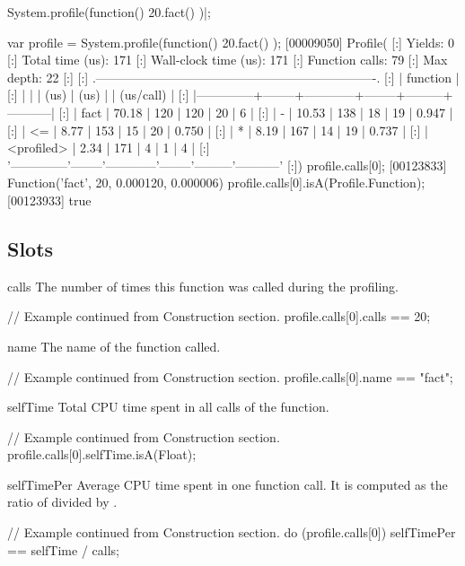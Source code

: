 \begin{urbiscript}
System.profile(function() { 20.fact() })|;

var profile = System.profile(function() { 20.fact() });
[00009050] Profile(
[:]  Yields:                    0
[:]  Total time (us):         171
[:]  Wall-clock time (us):    171
[:]  Function calls:           79
[:]  Max depth:                22
[:]
[:]  .-------------------------------------------------------------------.
[:]  |   function   |   %
[:]  |              |        |    (us)    |  (us)  |         | (us/call) |
[:]  |--------------+--------+------------+--------+---------+-----------|
[:]  |         fact |  70.18 |        120 |    120 |      20 |         6 |
[:]  |            - |  10.53 |        138 |     18 |      19 |     0.947 |
[:]  |           <= |   8.77 |        153 |     15 |      20 |     0.750 |
[:]  |            * |   8.19 |        167 |     14 |      19 |     0.737 |
[:]  |   <profiled> |   2.34 |        171 |      4 |       1 |         4 |
[:]  '--------------'--------'------------'--------'---------'-----------'
[:])
profile.calls[0];
[00123833] Function('fact', 20, 0.000120, 0.000006)
profile.calls[0].isA(Profile.Function);
[00123933] true
\end{urbiscript}

\subsection{Slots}

\begin{urbiscriptapi}
\item[calls]%
  The number of times this function was called during the profiling.
\begin{urbiassert}
// Example continued from Construction section.
profile.calls[0].calls == 20;
\end{urbiassert}


\item[name]%
  The name of the function called.
\begin{urbiassert}
// Example continued from Construction section.
profile.calls[0].name == "fact";
\end{urbiassert}


\item[selfTime]%
  Total CPU time spent in all calls of the function.
\begin{urbiassert}
// Example continued from Construction section.
profile.calls[0].selfTime.isA(Float);
\end{urbiassert}


\item[selfTimePer]%
  Average CPU time spent in one function call. It is computed as the ratio
  of  divided by .
\begin{urbiassert}
// Example continued from Construction section.
do (profile.calls[0])
{
  selfTimePer == selfTime / calls;
}
\end{urbiassert}
\end{urbiscriptapi}



